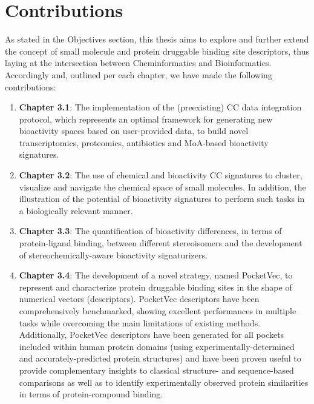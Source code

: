 \chapter{Contributions}
\label{Contributions}
\clearpage

As stated in the Objectives section, this thesis aims to explore and further extend the concept of small molecule and protein druggable binding site descriptors, thus laying at the intersection between Cheminformatics and Bioinformatics. Accordingly and, outlined per each chapter, we have made the following contributions:

\begin{enumerate}

\item \textbf{Chapter 3.1}: The implementation of the (preexisting) CC data integration protocol, which represents an optimal framework for generating new bioactivity spaces based on user-provided data, to build novel transcriptomics, proteomics, antibiotics and MoA-based bioactivity signatures. 

\item \textbf{Chapter 3.2}: The use of chemical and bioactivity CC signatures to cluster, visualize and navigate the chemical space of small molecules. In addition, the illustration of the potential of bioactivity signatures to perform such tasks in a biologically relevant manner.  

\item \textbf{Chapter 3.3}: The quantification of bioactivity differences, in terms of protein-ligand binding, between different stereoisomers and the development of stereochemically-aware bioactivity signaturizers. 

\item \textbf{Chapter 3.4}: The development of a novel strategy, named PocketVec, to represent and characterize protein druggable binding sites in the shape of numerical vectors (descriptors). PocketVec descriptors have been comprehensively benchmarked, showing excellent performances in multiple tasks while overcoming the main limitations of existing methods. Additionally, PocketVec descriptors have been generated for all pockets included within human protein domains (using experimentally-determined and accurately-predicted protein structures) and have been proven useful to provide complementary insights to classical structure- and sequence-based comparisons as well as to identify experimentally observed protein similarities in terms of protein-compound binding. 

\end{enumerate}